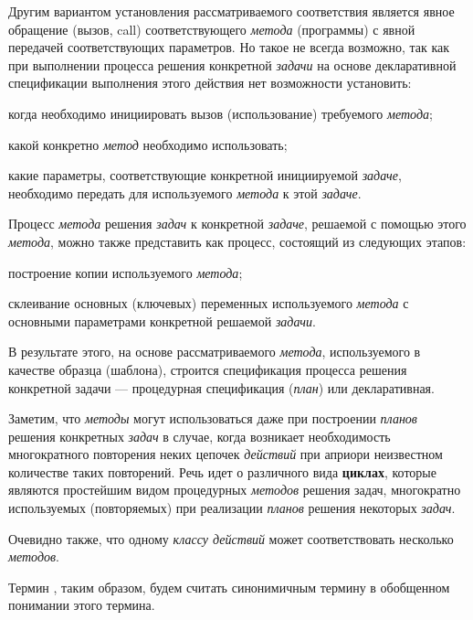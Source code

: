 Другим вариантом установления рассматриваемого соответствия является явное обращение (вызов, call) соответствующего \textit{метода} (программы) с явной передачей соответствующих параметров. Но такое не всегда возможно, так как при выполнении процесса решения конкретной \textit{задачи} на основе декларативной спецификации выполнения этого действия нет возможности установить:
\begin{textitemize}
	\item когда необходимо инициировать вызов (использование) требуемого \textit{метода};
	\item какой конкретно \textit{метод} необходимо использовать;
	\item какие параметры, соответствующие конкретной инициируемой \textit{задаче}, необходимо передать для  используемого \textit{метода} к этой \textit{задаче}.
\end{textitemize}

Процесс  \textit{метода} решения \textit{задач} к конкретной \textit{задаче}, решаемой с помощью этого \textit{метода}, можно также представить как процесс, состоящий из следующих этапов:
\begin{textitemize}
	\item построение копии используемого \textit{метода};
	\item склеивание основных (ключевых) переменных используемого \textit{метода} с основными параметрами конкретной решаемой \textit{задачи}.
\end{textitemize}

В результате этого, на основе рассматриваемого \textit{метода}, используемого в качестве образца (шаблона), строится спецификация процесса решения конкретной задачи --- процедурная спецификация (\textit{план}) или декларативная.

Заметим, что \textit{методы} могут использоваться даже при построении \textit{планов} решения конкретных \textit{задач} в случае, когда возникает необходимость многократного повторения неких цепочек \textit{действий} при априори неизвестном количестве таких повторений. Речь идет о различного вида \textbf{циклах}, которые являются простейшим видом процедурных \textit{методов} решения задач, многократно используемых (повторяемых) при реализации \textit{планов} решения некоторых \textit{задач}.

Очевидно также, что одному \textit{классу действий} может соответствовать несколько \textit{методов}.

Термин , таким образом, будем считать синонимичным термину  в обобщенном понимании этого термина.

